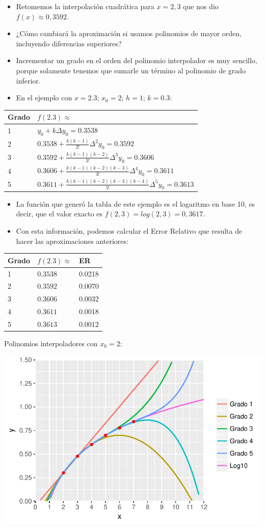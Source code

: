 \documentclass[openany]{book}
\providecommand{\tightlist}{%
  \setlength{\itemsep}{0pt}\setlength{\parskip}{0pt}}
\begin{document}
\begin{itemize}
\tightlist
\item
  Retomemos la interpolación cuadrática para \(x=2,3\) que nos dio \(f(x) \approx 0,3592\).
\item
  ¿Cómo cambiará la aproximación si usamos polinomios de mayor orden, incluyendo diferencias superiores?
\item
  Incrementar un grado en el orden del polinomio interpolador es muy sencillo, porque solamente tenemos que sumarle un término al polinomio de grado inferior.
\item
  En el ejemplo con \(x = 2.3\); \(x_0=2\); \(h = 1\); \(k = 0.3\):
\end{itemize}

\begin{longtable}[]{@{}ll@{}}
\toprule
Grado & \(f(2.3) \approx\)\tabularnewline
\midrule
\endhead
1 & \(y_0 + k \Delta y_0 = 0.3538\)\tabularnewline
2 & \(0.3538 + \frac{k(k-1)}{2!}\Delta^2 y_0 = 0.3592\)\tabularnewline
3 & \(0.3592 + \frac{k(k-1)(k-2)}{3!}\Delta^3 y_0 = 0.3606\)\tabularnewline
4 & \(0.3606 + \frac{k(k-1)(k-2)(k-3)}{4!}\Delta^4 y_0 = 0.3611\)\tabularnewline
5 & \(0.3611 + \frac{k(k-1)(k-2)(k-3)(k-4)}{5!}\Delta^5 y_0 = 0.3613\)\tabularnewline
\bottomrule
\end{longtable}

\begin{itemize}
\tightlist
\item
  La función que generó la tabla de este ejemplo es el logaritmo en base 10, es decir, que el valor exacto es \(f(2,3) = log(2,3) = 0,3617\).
\item
  Con esta información, podemos calcular el Error Relativo que resulta de hacer las aproximaciones anteriores:
\end{itemize}

\begin{longtable}[]{@{}lll@{}}
\toprule
Grado & \(f(2.3) \approx\) & ER\tabularnewline
\midrule
\endhead
1 & \(0.3538\) & 0.0218\tabularnewline
2 & \(0.3592\) & 0.0070\tabularnewline
3 & \(0.3606\) & 0.0032\tabularnewline
4 & \(0.3611\) & 0.0018\tabularnewline
5 & \(0.3613\) & 0.0012\tabularnewline
\bottomrule
\end{longtable}

Polinomios interpoladores con \(x_0=2\):

\begin{center}\includegraphics[width=0.9\linewidth]{Plots/U4/Unidad4_g4} \end{center}
\end{document}
